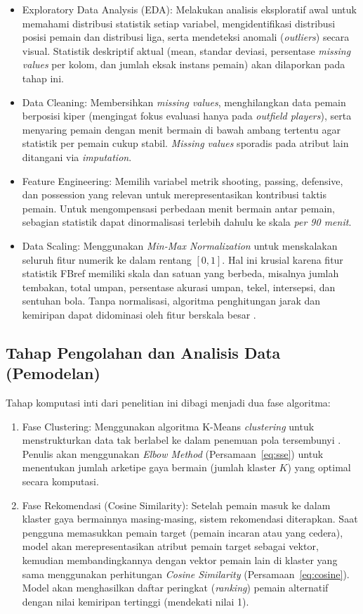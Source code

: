 \begin{itemize}
  \item Exploratory Data Analysis (EDA): Melakukan analisis eksploratif awal untuk memahami distribusi statistik setiap variabel, mengidentifikasi distribusi posisi pemain dan distribusi liga, serta mendeteksi anomali (\emph{outliers}) secara visual. Statistik deskriptif aktual (mean, standar deviasi, persentase \emph{missing values} per kolom, dan jumlah eksak instans pemain) akan dilaporkan pada tahap ini.
  \item Data Cleaning: Membersihkan \emph{missing values}, menghilangkan data pemain berposisi kiper (mengingat fokus evaluasi hanya pada \emph{outfield players}), serta menyaring pemain dengan menit bermain di bawah ambang tertentu agar statistik per pemain cukup stabil. \emph{Missing values} sporadis pada atribut lain ditangani via \emph{imputation}.
  \item Feature Engineering: Memilih variabel metrik shooting, passing, defensive, dan possession yang relevan untuk merepresentasikan kontribusi taktis pemain. Untuk mengompensasi perbedaan menit bermain antar pemain, sebagian statistik dapat dinormalisasi terlebih dahulu ke skala \emph{per 90 menit}.
  \item Data Scaling: Menggunakan \emph{Min-Max Normalization} untuk menskalakan seluruh fitur numerik ke dalam rentang $[0, 1]$. Hal ini krusial karena fitur statistik FBref memiliki skala dan satuan yang berbeda, misalnya jumlah tembakan, total umpan, persentase akurasi umpan, tekel, intersepsi, dan sentuhan bola. Tanpa normalisasi, algoritma penghitungan jarak dan kemiripan dapat didominasi oleh fitur berskala besar \parencite{shen2026}.
\end{itemize}

\subsection{Tahap Pengolahan dan Analisis Data (Pemodelan)}
\label{subsec:pemodelan}

Tahap komputasi inti dari penelitian ini dibagi menjadi dua fase algoritma:

\begin{enumerate}
  \item Fase Clustering: Menggunakan algoritma K-Means \emph{clustering} untuk menstrukturkan data tak berlabel ke dalam penemuan pola tersembunyi \parencite{shen2026}. Penulis akan menggunakan \emph{Elbow Method} (Persamaan~\eqref{eq:sse}) untuk menentukan jumlah arketipe gaya bermain (jumlah klaster $K$) yang optimal secara komputasi.
  \item Fase Rekomendasi (Cosine Similarity): Setelah pemain masuk ke dalam klaster gaya bermainnya masing-masing, sistem rekomendasi diterapkan. Saat pengguna memasukkan pemain target (pemain incaran atau yang cedera), model akan merepresentasikan atribut pemain target sebagai vektor, kemudian membandingkannya dengan vektor pemain lain di klaster yang sama menggunakan perhitungan \emph{Cosine Similarity} (Persamaan~\eqref{eq:cosine}). Model akan menghasilkan daftar peringkat (\emph{ranking}) pemain alternatif dengan nilai kemiripan tertinggi (mendekati nilai 1).
\end{enumerate}

